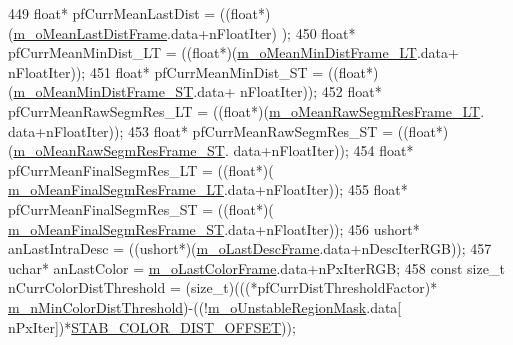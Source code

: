 \begin{DoxyCode}
449             \textcolor{keywordtype}{float}* pfCurrMeanLastDist = ((\textcolor{keywordtype}{float}*)(\mbox{\hyperlink{class_background_subtractor_su_b_s_e_n_s_e_ad95bb91ff7ef9db725772b37d679e1a2}{m\_oMeanLastDistFrame}}.data+nFloatIter)
      );
450             \textcolor{keywordtype}{float}* pfCurrMeanMinDist\_LT = ((\textcolor{keywordtype}{float}*)(\mbox{\hyperlink{class_background_subtractor_su_b_s_e_n_s_e_a8318e35d5fbbcffb8729700ef5e71a6e}{m\_oMeanMinDistFrame\_LT}}.data+
      nFloatIter));
451             \textcolor{keywordtype}{float}* pfCurrMeanMinDist\_ST = ((\textcolor{keywordtype}{float}*)(\mbox{\hyperlink{class_background_subtractor_su_b_s_e_n_s_e_a53584c5c79017947c59d05dfd247cf5e}{m\_oMeanMinDistFrame\_ST}}.data+
      nFloatIter));
452             \textcolor{keywordtype}{float}* pfCurrMeanRawSegmRes\_LT = ((\textcolor{keywordtype}{float}*)(\mbox{\hyperlink{class_background_subtractor_su_b_s_e_n_s_e_a7706b13433c4e9f4f8156e075fa7904d}{m\_oMeanRawSegmResFrame\_LT}}.
      data+nFloatIter));
453             \textcolor{keywordtype}{float}* pfCurrMeanRawSegmRes\_ST = ((\textcolor{keywordtype}{float}*)(\mbox{\hyperlink{class_background_subtractor_su_b_s_e_n_s_e_a3c9fd9cf995eb9a7b4006467ab874958}{m\_oMeanRawSegmResFrame\_ST}}.
      data+nFloatIter));
454             \textcolor{keywordtype}{float}* pfCurrMeanFinalSegmRes\_LT = ((\textcolor{keywordtype}{float}*)(
      \mbox{\hyperlink{class_background_subtractor_su_b_s_e_n_s_e_ad48e92b6d6bbce34f9f452484bc9956a}{m\_oMeanFinalSegmResFrame\_LT}}.data+nFloatIter));
455             \textcolor{keywordtype}{float}* pfCurrMeanFinalSegmRes\_ST = ((\textcolor{keywordtype}{float}*)(
      \mbox{\hyperlink{class_background_subtractor_su_b_s_e_n_s_e_a0dcd4f5df8adb9b4fa630a9a6f6b5e30}{m\_oMeanFinalSegmResFrame\_ST}}.data+nFloatIter));
456             ushort* anLastIntraDesc = ((ushort*)(\mbox{\hyperlink{class_background_subtractor_l_b_s_p_a9c637c0b87cac495887295690d83ba13}{m\_oLastDescFrame}}.data+nDescIterRGB));
457             uchar* anLastColor = \mbox{\hyperlink{class_background_subtractor_l_b_s_p_ab1dc003792ab1d0b881a6fd10e0e29b3}{m\_oLastColorFrame}}.data+nPxIterRGB;
458             \textcolor{keyword}{const} \textcolor{keywordtype}{size\_t} nCurrColorDistThreshold = (size\_t)(((*pfCurrDistThresholdFactor)*
      \mbox{\hyperlink{class_background_subtractor_su_b_s_e_n_s_e_ae0ebf701652a66bbdb0472d6f091e34d}{m\_nMinColorDistThreshold}})-((!\mbox{\hyperlink{class_background_subtractor_su_b_s_e_n_s_e_acfaf4c3c5aedbed8bd302444b4a4f8dd}{m\_oUnstableRegionMask}}.data[
      nPxIter])*\mbox{\hyperlink{_background_subtractor_su_b_s_e_n_s_e_8cpp_af60b797fbe4d762be8f140d56f6d8a0a}{STAB\_COLOR\_DIST\_OFFSET}}));

\end{DoxyCode}

